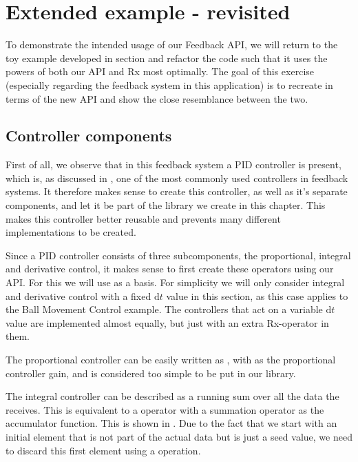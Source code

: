 \section{Extended example - revisited}
\label{sec:reactive-balltracker}
To demonstrate the intended usage of our Feedback API, we will return to the toy example developed in section  and refactor the code such that it uses the powers of both our API and Rx most optimally. The goal of this exercise (especially regarding the feedback system in this application) is to recreate  in terms of the new API and show the close resemblance between the two.

\subsection{Controller components}
First of all, we observe that in this feedback system a PID controller is present, which is, as discussed in , one of the most commonly used controllers in feedback systems. It therefore makes sense to create this controller, as well as it's separate components, and let it be part of the library we create in this chapter. This makes this controller better reusable and prevents many different implementations to be created.

Since a PID controller consists of three subcomponents, the proportional, integral and derivative control, it makes sense to first create these operators using our API. For this we will use  as a basis. For simplicity we will only consider integral and derivative control with a fixed $\mathrm{d} t$ value in this section, as this case applies to the Ball Movement Control example. The controllers that act on a variable $\mathrm{d} t$ value are implemented almost equally, but just with an extra  Rx-operator in them.

The proportional controller can be easily written as , with  as the proportional controller gain, and is considered too simple to be put in our library.

The integral controller can be described as a running sum over all the data the \comp receives. This is equivalent to a  operator with a summation operator as the accumulator function. This is shown in . Due to the fact that we start with an initial element that is not part of the actual data but is just a seed value, we need to discard this first element using a  operation.

